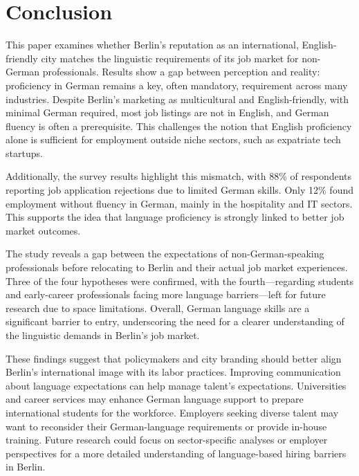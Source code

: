 \chapter{Conclusion}

This paper examines whether Berlin’s reputation as an international, English-friendly city matches the linguistic requirements of its job market for non-German professionals. Results show a gap between perception and reality: proficiency in German remains a key, often mandatory, requirement across many industries. Despite Berlin’s marketing as multicultural and English-friendly, with minimal German required, most job listings are not in English, and German fluency is often a prerequisite. This challenges the notion that English proficiency alone is sufficient for employment outside niche sectors, such as expatriate tech startups. 

Additionally, the survey results highlight this mismatch, with 88\% of respondents reporting job application rejections due to limited German skills. Only 12\% found employment without fluency in German, mainly in the hospitality and IT sectors. This supports the idea that language proficiency is strongly linked to better job market outcomes.

The study reveals a gap between the expectations of non-German-speaking professionals before relocating to Berlin and their actual job market experiences. Three of the four hypotheses were confirmed, with the fourth—regarding students and early-career professionals facing more language barriers—left for future research due to space limitations. Overall, German language skills are a significant barrier to entry, underscoring the need for a clearer understanding of the linguistic demands in Berlin’s job market.

These findings suggest that policymakers and city branding should better align Berlin’s international image with its labor practices. Improving communication about language expectations can help manage talent’s expectations. Universities and career services may enhance German language support to prepare international students for the workforce. Employers seeking diverse talent may want to reconsider their German-language requirements or provide in-house training. Future research could focus on sector-specific analyses or employer perspectives for a more detailed understanding of language-based hiring barriers in Berlin.
